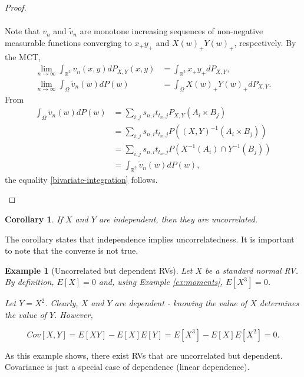 \documentclass{book}
\theoremstyle{plain}%
\newtheorem{prototheorem}{Example}[section]
\newenvironment{cexample}
   {\colorlet{shadecolor}{gray!10}\begin{shaded}\begin{prototheorem}}
   {\end{prototheorem}\end{shaded}}
\newtheorem{corollary}{Corollary}[section]
\theoremstyle{definition}
\begin{document}
\begin{proof}
\begin{enumerate}
\begin{align*}
        \end{align*}
        Note that $v_n$ and $\tilde v_n$ are monotone increasing sequences of non-negative measurable functions converging to
        $x_+y_+$ and $X(w)_+Y(w)_+$, respectively. By the MCT,
        \begin{align*}
            \lim_{n\to \infty} 
            \int_{\mathbb{R}^2} v_n(x,y) dP_{X,Y}(x,y)
            &=
            \int_{\mathbb{R}^2} x_+y_+ dP_{X,Y},\\
            \lim_{n\to \infty} \int_{\Omega} \tilde v_n(w) dP(w)
            &=
            \int_{\Omega} X(w)_+Y(w)_+ dP_{X,Y}.
        \end{align*}
        From 
        \begin{align*}
        \int_{\Omega} \tilde v_n(w) dP(w)
        &=
        \sum_{i,j}s_{n,i}t_{t_n,j}P_{X,Y}(A_i\times B_j)\\
        &=
        \sum_{i,j}s_{n,i}t_{t_n,j}P((X,Y)^{-1}(A_i\times B_j))\\
        &=
        \sum_{i,j}s_{n,i}t_{t_n,j}P(X^{-1}(A_i)\cap Y^{-1}(B_j))\\
        &=
        \int_{\mathbb{R}^2} \tilde v_n(w)dP(w),
        \end{align*}
        the equality \eqref{bivariate-integration} follows.
    \end{enumerate}
\end{proof}


\begin{corollary}
If $X$ and $Y$ are independent, then they are uncorrelated.
\end{corollary}

The corollary states that independence implies uncorrelatedness. It is important to note that the converse is not true.

\begin{cexample}[Uncorrelated but dependent RVs]
Let $X$ be a standard normal RV. By definition, $E[X] = 0$ and, using Example \ref{ex:moments}, $E[X^3] = 0$.

Let $Y = X^2$. Clearly, $X$ and $Y$ are dependent - knowing the value of $X$ determines the value of $Y$. However,

$$Cov[X,Y] = E[XY] - E[X]E[Y] = E[X^3] - E[X]E[X^2] = 0.$$
\end{cexample}

As this example shows, there exist RVs that are uncorrelated but dependent. Covariance is just a special case of dependence (linear dependence).
\end{document}
